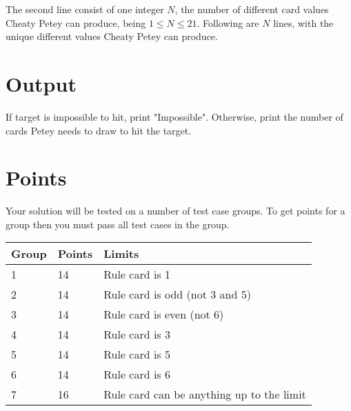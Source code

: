 The second line consist of one integer $N$, the number of different card values Cheaty Petey can produce, being $1\leq N \leq 21$. Following are $N$ lines, with the unique different values Cheaty Petey can produce.

\section*{Output}
If target is impossible to hit, print "Impossible". Otherwise, print the number of cards Petey needs to draw to hit the target.

\section*{Points}
Your solution will be tested on a number of test case groups. To get points for a group then you must pass all test cases in the group.

\begin{tabular}{|l|l|l|}
    \hline
    Group & Points & Limits                                    \\ \hline
    1     & 14     & Rule card is 1                            \\ \hline
    2     & 14     & Rule card is odd (not 3 and 5)            \\ \hline
    3     & 14     & Rule card is even (not 6)                 \\ \hline
    4     & 14     & Rule card is 3                            \\ \hline
    5     & 14     & Rule card is 5                            \\ \hline
    6     & 14     & Rule card is 6                            \\ \hline
    7     & 16     & Rule card can be anything up to the limit \\ \hline
\end{tabular}
